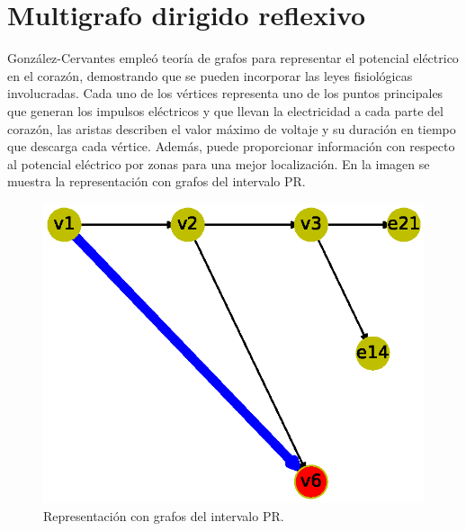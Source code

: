\documentclass{article}
\begin{document}
\section{Multigrafo dirigido reflexivo}
González-Cervantes \cite{gonzalez2016potencial} empleó teoría de grafos para representar el potencial eléctrico en el corazón, demostrando que se pueden incorporar las leyes fisiológicas involucradas. Cada uno de los vértices representa uno de los puntos principales que generan los impulsos eléctricos y que llevan la electricidad a cada parte del corazón, las aristas describen el valor máximo de voltaje y su
duración en tiempo que descarga cada vértice. Además, puede proporcionar información con respecto al potencial eléctrico por zonas para una mejor localización.
En la imagen se muestra la representación con grafos del intervalo PR.



\begin{figure}
  \centering 
  \includegraphics[width=.8\columnwidth]{12.eps}
  \caption{Representación con grafos del intervalo PR.}
  \label{fig:12}
\end{figure}


\newpage


\end{document}
